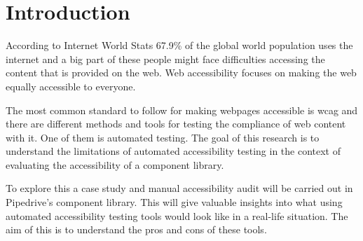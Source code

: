 \documentclass{master_thesis}
\begin{document}
\section{Introduction} \label{chap:intro}




According to Internet World Stats 67.9\% of the global world population uses the internet \citep{MMG2023} and a big part of these people might face difficulties accessing the content that is provided on the web. Web accessibility focuses on making the web equally accessible to everyone.


The most common standard to follow for making webpages accessible is \ac{wcag} and there are different methods and tools for testing the compliance of web content with it. One of them is automated testing. The goal of this research is to understand the limitations of automated accessibility testing in the context of evaluating the accessibility of a component library.


To explore this a case study and manual accessibility audit will be carried out in Pipedrive's component library. This will give valuable insights into what using automated accessibility testing tools would look like in a real-life situation. The aim of this is to understand the pros and cons of these tools.
\end{document}
